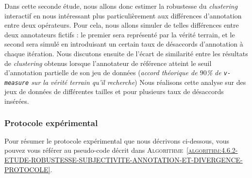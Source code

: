 		Dans cette seconde étude, nous allons donc estimer la robustesse du \textit{clustering} interactif en nous intéressant plus particulièrement aux différences d'annotation entre deux opérateurs.
		Pour cela, nous allons simuler de telles différences entre deux annotateurs fictifs : le premier sera représenté par la vérité terrain, et le second sera simulé en introduisant un certain taux de désaccords d'annotation à chaque itération.
		Nous discutons ensuite de l'écart de similarité entre les résultats de \textit{clustering} obtenus lorsque l'annotateur de référence atteint le seuil d'annotation partielle de son jeu de données (\textit{accord théorique de $90$\% de \texttt{v-measure} sur la vérité terrain qu'il recherche})
		Nous réalisons cette analyse sur des jeux de données de différentes tailles et pour plusieurs taux de désaccords insérées.
	
		\subsubsection{Protocole expérimental}
			
			Pour résumer le protocole expérimental que nous décrivons ci-dessous, vous pouvez vous référer au pseudo-code décrit dans \textsc{Algorithme~\ref{algorithm:4.6.2-ETUDE-ROBUSTESSE-SUBJECTIVITE-ANNOTATION-ET-DIVERGENCE-PROTOCOLE}}.
			
